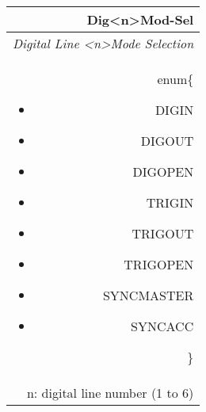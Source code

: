 \documentclass[openany]{article}
\begin{document}
		\begin{tabular}{N}
			\hline
			\bfseries Dig{\textless n\textgreater}Mod-Sel\label{pv:digmod-sel} \\ \hline
			\emph{Digital Line \textless n\textgreater Mode Selection} \\
			enum\{\begin{itemize}[noitemsep]
				\small
				\item[] DIGIN
				\item[] DIGOUT
				\item[] DIGOPEN
				\item[] TRIGIN
				\item[] TRIGOUT
				\item[] TRIGOPEN
				\item[] SYNCMASTER
				\item[] SYNCACC
			\end{itemize}\} \\
			n: digital line number (1 to 6) \\

\end{tabular}
\end{document}
